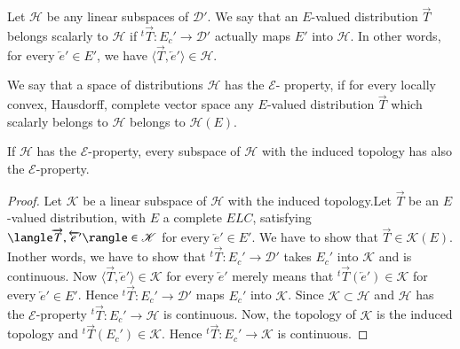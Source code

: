 \begin{definition}\label{chap3:def3.4}
Let $\mathscr{H}$ be any linear subspaces of $\mathscr{D}'$. We say
that an $E$-valued distribution $\overrightarrow{T}$ belongs scalarly
to $\mathscr{H}$ if ${}^t\overrightarrow{T}:E_c'\to \mathscr{D}'$
actually maps $E'$ into $\mathscr{H}$. In other words, for every
$\overleftarrow{e}' \in E'$, we have $\langle \overrightarrow{T},
\overleftarrow{e}'\rangle \in \mathscr{H}$. 
\end{definition}

\begin{definition}\label{chap3:def3.5}
We say that a space of distributions $\mathscr{H}$ has the $\mathcal{E}$-
property, if for every locally convex, Hausdorff, complete vector
space any $E$-valued distribution $\overrightarrow{T}$ which scalarly
belongs to $\mathscr{H}$ belongs to $\mathscr{H}(E)$.
\end{definition}

\begin{prop}\label{chap3:prop3.2}
If $\mathscr{H}$ has the $\mathcal{E}$-property, every subspace of
$\mathscr{H}$ with the induced topology has also the $\mathcal{E}$-property.
\end{prop}

\begin{proof}
Let $\mathscr{K}$ be a linear subspace of $\mathscr{H}$ with the
induced topology.Let $\overrightarrow{T}$ be an $E$-valued
distribution, with $E$ a complete $ELC$, satisfying
$\langle\overrightarrow{T},\break \overleftarrow{e}'\rangle \in \mathscr{K}$
for every $\overleftarrow{e}'\in E'$. We have to show that
$\overrightarrow{T} \in \mathscr{K}(E)$. In\pageoriginale  other
words, we have to show that ${}^t\overrightarrow{T}:E_c'\rightarrow
\mathscr{D}'$ takes $E_c'$ into $\mathscr{K}$ and is continuous. Now
$\langle \overrightarrow{T}, \overleftarrow{e}'\rangle \in
\mathscr{K}$ for every $\overleftarrow{e}'$ merely means that
${}^t\overrightarrow{T}(\overleftarrow{e}') \in \mathscr{K}$ for every
$\overleftarrow{e}' \in E'$. Hence ${}^t\overrightarrow{T}: E_c'
\rightarrow \mathscr{D}'$ maps $E_c'$ into $\mathscr{K}$. Since
$\mathscr{K}\subset \mathscr{H}$ and $\mathscr{H}$ has the
$\mathcal{E}$-property ${}^t\overrightarrow{T}: E_c' \rightarrow
\mathscr{H}$ is continuous. Now, the topology of $\mathscr{K}$ is the
induced topology and ${}^t\overrightarrow{T}(E_c')\in
\mathscr{K}$. Hence ${}^t\overrightarrow{T}:E_c' \rightarrow
\mathscr{K}$ is continuous.     
\end{proof}


